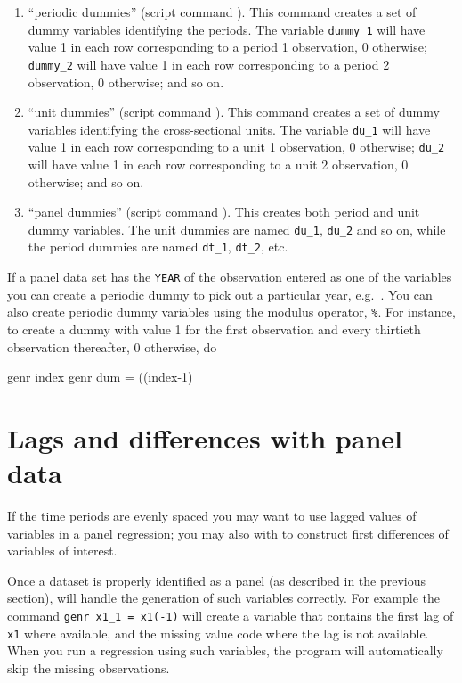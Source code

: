 \begin{enumerate}
\item ``periodic dummies'' (script command ).  This
  command creates a set of dummy variables identifying the periods.
  The variable \verb+dummy_1+ will have value 1 in each row
  corresponding to a period 1 observation, 0 otherwise; \verb+dummy_2+
  will have value 1 in each row corresponding to a period 2
  observation, 0 otherwise; and so on.
\item ``unit dummies'' (script command ).  This
  command creates a set of dummy variables identifying the
  cross-sectional units.  The variable \verb+du_1+ will have value 1
  in each row corresponding to a unit 1 observation, 0 otherwise;
  \verb+du_2+ will have value 1 in each row corresponding to a unit 2
  observation, 0 otherwise; and so on.
\item ``panel dummies'' (script command ).  This
  creates both period and unit dummy variables. The unit dummies are
  named \verb+du_1+, \verb+du_2+ and so on, while the period dummies
  are named \verb+dt_1+, \verb+dt_2+, etc.
\end{enumerate}

If a panel data set has the \verb+YEAR+ of the observation entered as
one of the variables you can create a periodic dummy to pick out a
particular year, e.g.\ .  You can also
create periodic dummy variables using the modulus operator,
\verb+%+.  For instance, to create a dummy with
value 1 for the first observation and every thirtieth observation
thereafter, 0 otherwise, do
\begin{code}
      genr index 
      genr dum = ((index-1)%
\end{code}

\section{Lags and differences with panel data}
\label{panel-lagged}

If the time periods are evenly spaced you may want to use lagged
values of variables in a panel regression; you may also with to
construct first differences of variables of interest.

Once a dataset is properly identified as a panel (as described in the
previous section),  will handle the generation of such
variables correctly.  For example the command
\verb+genr x1_1 = x1(-1)+ will create a variable that contains the
first lag of \verb+x1+ where available, and the missing value code
where the lag is not available.  When you run a regression using such
variables, the program will automatically skip the missing
observations.

